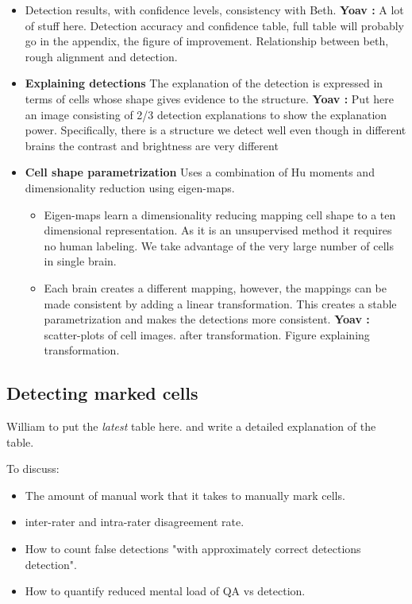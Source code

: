 \documentclass[runningheads]{llncs}
\newcommand{\comment}[3]{{\color{#1} {\bf #2 :} #3}}
\newcommand{\yoav}[1]{\comment{purple}{Yoav}{#1}}
\begin{document}
\begin{itemize}
    \item Detection results, with confidence levels, consistency with Beth.
    \yoav{A lot of stuff here. Detection accuracy and confidence table, full table will probably go in the appendix, the figure of improvement. Relationship between beth, rough alignment and detection.}
    \item {\bf Explaining detections} The explanation of the detection is expressed in terms of cells whose shape gives evidence to the structure.
    \yoav{Put here an image consisting of 2/3 detection explanations to show the explanation power. Specifically, there is a structure we detect well even though in different brains the contrast and brightness are very different}
\item {\bf Cell shape parametrization} Uses a combination of Hu moments and dimensionality reduction using eigen-maps.
\begin{itemize}
    \item Eigen-maps learn a dimensionality reducing mapping cell shape to a ten dimensional representation.
    As it is an unsupervised method it requires no human labeling. We take advantage of the very large number of cells in single brain. 
    \item Each brain creates a different mapping, however, the mappings can be made consistent by adding a linear transformation. This creates a stable parametrization and makes the detections more consistent.\yoav{scatter-plots of cell images. after transformation. Figure explaining transformation.}
\end{itemize}
\end{itemize}

\subsection{Detecting marked cells}

William to put the {\em latest} table here. and write a detailed
explanation of the table.

To discuss:
\begin{itemize}
\item The amount of manual work that it takes to manually mark cells.
\item inter-rater and intra-rater disagreement rate.
\item How to count false detections "with approximately correct
  detections detection".
\item How to quantify reduced mental load of QA vs detection.
\end{itemize}
\end{document}

